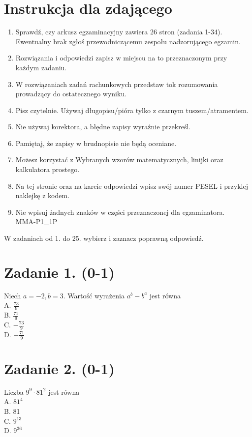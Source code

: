 \documentclass[10pt]{article}
\begin{document}
\section*{Instrukcja dla zdającego}
\begin{enumerate}
  \item Sprawdź, czy arkusz egzaminacyjny zawiera 26 stron (zadania 1-34). Ewentualny brak zgłoś przewodniczącemu zespołu nadzorującego egzamin.
  \item Rozwiązania i odpowiedzi zapisz w miejscu na to przeznaczonym przy każdym zadaniu.
  \item W rozwiązaniach zadań rachunkowych przedstaw tok rozumowania prowadzący do ostatecznego wyniku.
  \item Pisz czytelnie. Używaj długopisu/pióra tylko z czarnym tuszem/atramentem.
  \item Nie używaj korektora, a błędne zapisy wyraźnie przekreśl.
  \item Pamiętaj, że zapisy w brudnopisie nie będą oceniane.
  \item Możesz korzystać z Wybranych wzorów matematycznych, linijki oraz kalkulatora prostego.
  \item Na tej stronie oraz na karcie odpowiedzi wpisz swój numer PESEL i przyklej naklejkę z kodem.
  \item Nie wpisuj żadnych znaków w części przeznaczonej dla egzaminatora.\\
MMA-P1\_1P
\end{enumerate}

W zadaniach od 1. do 25. wybierz i zaznacz poprawną odpowiedź.

\section*{Zadanie 1. (0-1)}
Niech \(a=-2, b=3\). Wartość wyrażenia \(a^{b}-b^{a}\) jest równa\\
A. \(\frac{73}{9}\)\\
B. \(\frac{71}{9}\)\\
C. \(-\frac{73}{9}\)\\
D. \(-\frac{71}{9}\)

\section*{Zadanie 2. (0-1)}
Liczba \(9^{9} \cdot 81^{2}\) jest równa\\
A. \(81^{4}\)\\
B. 81\\
C. \(9^{13}\)\\
D. \(9^{36}\)
\end{document}
